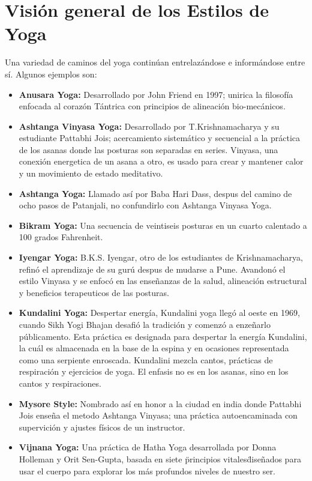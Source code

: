 \section{Visión general de los Estilos de Yoga}
Una variedad de caminos del yoga continúan entrelazándose e informándose entre sí. Algunos ejemplos son:
\begin{itemize}
	\item \textbf{Anusara Yoga:} Desarrollado por John Friend en 1997; unirica la filosofía enfocada al corazón Tántrica con principios de alineación bio-mecánicos.
	\item \textbf{Ashtanga Vinyasa Yoga:} Desarrollado por T.Krishnamacharya y su estudiante Pattabhi Jois; acercamiento sistemático y secuencial a la práctica de los asanas donde las posturas son separadas en series. Vinyasa, una conexión energetica de un asana a otro, es usado para crear y mantener calor y un movimiento de estado meditativo.
	\item \textbf{Ashtanga Yoga:} Llamado así por Baba Hari Dass, despus del camino de ocho pasos de Patanjali, no confundirlo con Ashtanga Vinyasa Yoga.
	\item \textbf{Bikram Yoga:} Una secuencia de veintiseis posturas en un cuarto calentado a 100 grados Fahrenheit.
	\item \textbf{Iyengar Yoga:} B.K.S. Iyengar, otro de los estudiantes de Krishnamacharya, refinó el aprendizaje de su gurú despus de mudarse a Pune. Avandonó el estilo Vinyasa y se enfocó en las enseñanzas de la salud, alineación estructural y beneficios terapeuticos de las posturas.
	\item \textbf{Kundalini Yoga:} Despertar energía, Kundalini yoga llegó al oeste en 1969, cuando Sikh Yogi Bhajan desafió la tradición y comenzó a enzeñarlo públicamento. Esta práctica es designada para despertar la energía Kundalini, la cuál es almacenada en la base de la espina y en ocasiones representada como una serpiente enroscada. Kundalini mezcla cantos, prácticas de respiración y ejercicios de yoga. El enfasis no es en los asanas, sino en los cantos y respiraciones.
	\item \textbf{Mysore Style:} Nombrado así en honor a la ciudad en india donde Pattabhi Jois enseña el metodo Ashtanga Vinyasa; una práctica autoencaminada con supervición y ajustes físicos de un instructor.
	\item \textbf{Vijnana Yoga:} Una práctica de Hatha Yoga desarrollada por Donna Holleman y Orit Sen-Gupta, basada en siete \"principios vitales\" diseñados para usar el cuerpo para explorar los más profundos niveles de nuestro ser.

\end{itemize}
